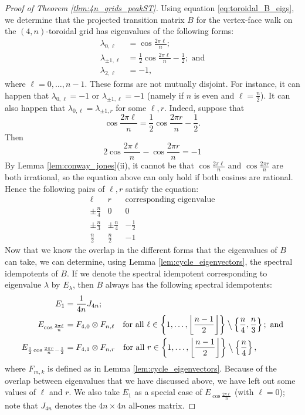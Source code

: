 \documentclass{article}
\numberwithin{equation}{section}
\begin{document}
\begin{proof}[Proof of Theorem \ref{thm:4n_grids_peakST}]
Using equation \eqref{eq:toroidal_B_eigs}, we determine that the projected transition matrix $B$ for the vertex-face walk on the $(4,n)$-toroidal grid has eigenvalues of the following forms:
\[
\begin{split}
\lambda_{0,\ell} &= \cos\frac{2\pi \ell}{n}; \\
\lambda_{\pm 1, \ell } &= \frac{1}{2}\cos\frac{2\pi \ell}{n} - \frac{1}{2}; \text{ and}\\
\lambda_{2,\ell} &= -1,
\end{split}
\]
where $\ell = 0,\ldots,n-1$. These forms are not mutually disjoint. For instance, it can happen that $\lambda_{0,\ell} = -1$ or $\lambda_{\pm 1,\ell} = -1$ (namely if $n$ is even and $\ell = \frac{n}{2}$). It can also happen that $\lambda_{0,\ell} = \lambda_{\pm 1,r}$ for some $\ell,r$. Indeed, suppose that
\[
\cos\frac{2\pi \ell}{n} = \frac{1}{2}\cos\frac{2\pi r}{n} - \frac{1}{2}.
\]
Then
\[
2\cos\frac{2\pi \ell}{n} - \cos\frac{2\pi r}{n} = -1
\]
By Lemma \ref{lem:conway_jones}(ii), it cannot be that $\cos\frac{2\pi \ell}{n}$ and $\cos\frac{2\pi r}{n}$ are both irrational, so the equation above can only hold if both cosines are rational. Hence the following pairs of $\ell,r$ satisfy the equation:
\[
\begin{array}{c|c|c}
     \ell & r & \text{corresponding eigenvalue} \\ \hline
     \pm \frac{n}{4} & 0 & 0 \\
     \pm \frac{n}{3} & \pm \frac{n}{4} & -\frac{1}{2}\\
     \frac{n}{2} & \frac{n}{2} & -1
\end{array}
\]
Now that we know the overlap in the different forms that the eigenvalues of $B$ can take, we can determine, using Lemma \ref{lem:cycle_eigenvectors}, the spectral idempotents of $B$. If we denote the spectral idempotent corresponding to eigenvalue $\lambda$ by $E_\lambda$, then $B$ always has the following spectral idempotents:
\begin{align}
\nonumber E_1 &= \frac{1}{4n}J_{4n};\\
\label{eq:cos_idempotent1} E_{\cos\frac{2\pi \ell}{n}} &= F_{4,0} \otimes F_{n,\ell} \quad \text{for all } \ell \in \left\{1,\ldots,\left\lfloor\frac{n-1}{2}\right\rfloor \right\} \mathbin{\big\backslash} \left\{\frac{n}{4},\frac{n}{3}\right\}; \text{ and} \\
\label{eq:cos_idempotent2} E_{\frac{1}{2}\cos\frac{2\pi r}{n} - \frac{1}{2}} &= F_{4,1} \otimes F_{n,r} \quad \text{for all } r \in \left\{1,\ldots,\left\lfloor\frac{n-1}{2}\right\rfloor\right\} \mathbin{\big\backslash} \left\{\frac{n}{4}\right\},
\end{align}
where $F_{m,k}$ is defined as in Lemma \ref{lem:cycle_eigenvectors}. Because of the overlap between eigenvalues that we have discussed above, we have left out some values of $\ell$ and $r$. We also take $E_1$ as a special case of $E_{\cos\frac{2\pi \ell}{n}}$ (with $\ell = 0$); note that $J_{4n}$ denotes the $4n \times 4n$ all-ones matrix.


\end{proof}
\end{document}

